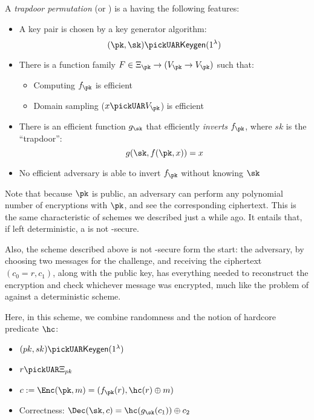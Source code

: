 A \emph{trapdoor permutation} (or \tdp) is a \owp{} having the following features:

\begin{itemize}
    \item A key pair is chosen \uar{} by a key generator algorithm:
    \[
        (\pk, \sk) \pickUAR \keygen(1^\lambda)
    \]
    \item There is a function family $F \in \Xi_\pk \to (V_{\pk} \to V_{\pk})$ such that:
    \begin{itemize}
        \item Computing $f_{\pk}$ is efficient
        \item Domain sampling ($x \pickUAR V_{\pk}$) is efficient
    \end{itemize}
    \item There is an efficient function $g_{\sk}$ that efficiently \emph{inverts} $f_{\pk}$, where $sk$ is the ``trapdoor'': 
    \[
        g(\sk, f(\pk, x)) = x
    \]
    \item No efficient adversary is able to invert $f_{\pk}$ without knowing $\sk$
\end{itemize}

Note that because $\pk$ is public, an adversary can perform any polynomial number of encryptions with $\pk$, and see the corresponding ciphertext. This is the same characteristic of \pke{} schemes we described just a while ago. It entails that, if left deterministic, a \tdp{} is not \cpa-secure.

Also, the scheme described above is not \cpa-secure form the start: the adversary, by choosing two messages for the challenge, and receiving the ciphertext $(c_0 = r, c_1)$, along with the public key, has everything needed to reconstruct the encryption and check whichever message was encrypted, much like the problem of \ufcma against a deterministic \mac scheme.

Here, in this scheme, we combine randomness and the notion of hardcore predicate $\hc$:

\begin{itemize}
    \item $(pk, sk) \pickUAR \keygen(1^\lambda)$
    \item $r \pickUAR \Xi_{pk}$
    \item $c := \Enc(\pk, m) = (f_{\pk}(r), \hc(r) \oplus m)$
    \item Correctness: $\Dec(\sk, c) = \hc(g_{\sk}(c_1)) \oplus c_2$
\end{itemize}

